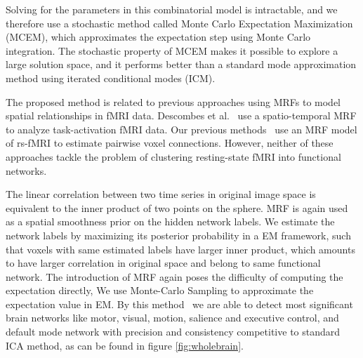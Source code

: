 \documentclass[12pt]{article}
\begin{document}
Solving for the parameters in this combinatorial model is intractable, and we
therefore use a stochastic method called Monte Carlo Expectation Maximization
(MCEM), which approximates the expectation step using Monte Carlo
integration. The stochastic property of MCEM makes it possible to explore a
large solution space, and it performs better than a standard mode approximation
method using iterated conditional modes (ICM).

The proposed method is related to previous approaches using MRFs to model
spatial relationships in fMRI data. Descombes et
al.~\cite{descombes_spatio-temporal_1998} use a spatio-temporal MRF to analyze
task-activation fMRI data. Our previous methods~\cite{liu2010spatial} use an MRF
model of rs-fMRI to estimate pairwise voxel connections. However, neither of
these approaches tackle the problem of clustering resting-state fMRI into
functional networks.

The linear correlation between two time series in original image space is
equivalent to the inner product of two points on the sphere.  MRF is again used
as a spatial smoothness prior on the hidden network labels. We estimate the
network labels by maximizing its posterior probability in a EM framework, such
that voxels with same estimated labels have larger inner product, which amounts
to have larger correlation in original space and belong to same functional
network. The introduction of MRF again poses the difficulty of computing the
expectation directly, We use Monte-Carlo Sampling to approximate the expectation
value in EM. By this method~\cite{liu2011monte} we are able to detect most
significant brain networks like motor, visual, motion, salience and executive
control, and default mode network with precision and consistency competitive to
standard ICA method, as can be found in figure \ref{fig:wholebrain}.
\end{document}
